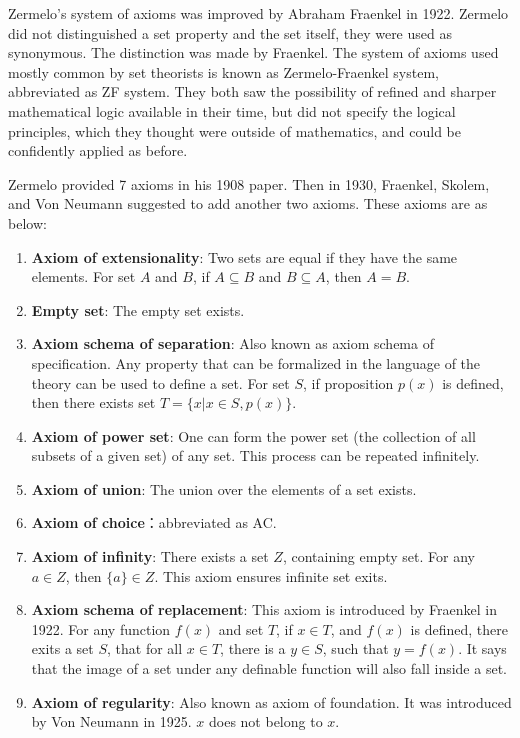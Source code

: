 \documentclass{article}
\begin{document}
 
Zermelo's system of axioms was improved by Abraham Fraenkel in 1922. Zermelo did not distinguished a set property and the set itself, they were used as synonymous. The distinction was made by Fraenkel. The system of axioms used mostly common by set theorists is known as Zermelo-Fraenkel system, abbreviated as ZF system. They both saw the possibility of refined and sharper mathematical logic available in their time, but did not specify the logical principles, which they thought were outside of mathematics, and could be confidently applied as before\cite{M-Kline-2007}.

Zermelo provided 7 axioms in his 1908 paper. Then in 1930, Fraenkel, Skolem, and Von Neumann suggested to add another two axioms. These axioms are as below:

\begin{enumerate}
\item \textbf{Axiom of extensionality}: Two sets are equal if they have the same elements. For set $A$ and $B$, if $A \subseteq B$ and $B \subseteq A$, then $A = B$.

\item \textbf{Empty set}: The empty set exists.

\item \textbf{Axiom schema of separation}: Also known as axiom schema of specification. Any property that can be formalized in the language of the theory can be used to define a set. For set $S$, if proposition $p(x)$ is defined, then there exists set $T = \{ x | x \in S, p(x)\}$.

\item \textbf{Axiom of power set}: One can form the power set (the collection of all subsets of a given set) of any set. This process can be repeated infinitely.

\item \textbf{Axiom of union}: The union over the elements of a set exists.

\item \textbf{Axiom of choice}：abbreviated as AC.

\item \textbf{Axiom of infinity}: There exists a set $Z$, containing empty set. For any $a \in Z$, then $\{a\} \in Z$. This axiom ensures infinite set exits.

\item \textbf{Axiom schema of replacement}: This axiom is introduced by Fraenkel in 1922. For any function $f(x)$ and set $T$, if $x \in T$, and $f(x)$ is defined, there exits a set $S$, that for all $x \in T$, there is a $y \in S$, such that $y = f(x)$. It says that the image of a set under any definable function will also fall inside a set.

\item \textbf{Axiom of regularity}: Also known as axiom of foundation. It was introduced by Von Neumann in 1925. $x$ does not belong to $x$.
\end{enumerate}
\end{document}
